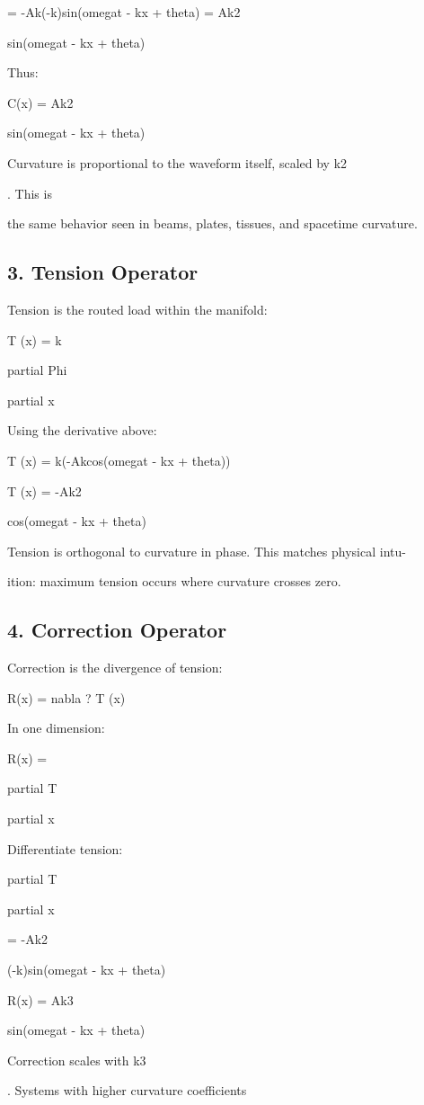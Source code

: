 \documentclass[10pt]{article}
\begin{document}
= -Ak(-k)sin(omegat - kx + theta) = Ak2

sin(omegat - kx + theta)

Thus:

C(x) = Ak2

sin(omegat - kx + theta)

Curvature is proportional to the waveform itself, scaled by k2

. This is

the same behavior seen in beams, plates, tissues, and spacetime curvature.

\subsection*{3. Tension Operator}
Tension is the routed load within the manifold:

T (x) = k

partial Phi

partial x

Using the derivative above:

T (x) = k(-Akcos(omegat - kx + theta))

T (x) = -Ak2

cos(omegat - kx + theta)

Tension is orthogonal to curvature in phase. This matches physical intu-

ition: maximum tension occurs where curvature crosses zero.

\subsection*{4. Correction Operator}
Correction is the divergence of tension:

R(x) = nabla  ? T (x)

In one dimension:

R(x) =

partial T

partial x

Differentiate tension:

partial T

partial x

= -Ak2

(-k)sin(omegat - kx + theta)


R(x) = Ak3

sin(omegat - kx + theta)

Correction scales with k3

. Systems with higher curvature coefficients
\end{document}
